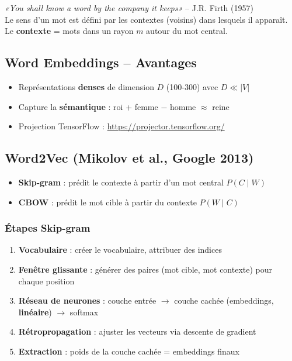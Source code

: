 \documentclass[a4paper,10pt]{article}
\begin{document}
\begin{keybox}
\textit{«You shall know a word by the company it keeps»} -- J.R. Firth (1957)\\
Le sens d'un mot est défini par les contextes (voisins) dans lesquels il apparaît.\\
Le \textbf{contexte} = mots dans un rayon $m$ autour du mot central.
\end{keybox}

\subsection{Word Embeddings -- Avantages}
\begin{itemize}
  \item Représentations \textbf{denses} de dimension $D$ (100-300) avec $D \ll |V|$
  \item Capture la \textbf{sémantique} : roi + femme $-$ homme $\approx$ reine
  \item Projection TensorFlow : \url{https://projector.tensorflow.org/}
\end{itemize}

\subsection{Word2Vec (Mikolov et al., Google 2013)}

\begin{definitionbox}
\begin{itemize}
  \item \textbf{Skip-gram} : prédit le contexte à partir d'un mot central $P(C \mid W)$
  \item \textbf{CBOW} : prédit le mot cible à partir du contexte $P(W \mid C)$
\end{itemize}
\end{definitionbox}

\subsubsection{Étapes Skip-gram}
\begin{enumerate}
  \item \textbf{Vocabulaire} : créer le vocabulaire, attribuer des indices
  \item \textbf{Fenêtre glissante} : générer des paires (mot cible, mot contexte) pour chaque position
  \item \textbf{Réseau de neurones} : couche entrée $\rightarrow$ couche cachée (embeddings, \textbf{linéaire}) $\rightarrow$ softmax
  \item \textbf{Rétropropagation} : ajuster les vecteurs via descente de gradient
  \item \textbf{Extraction} : poids de la couche cachée = embeddings finaux
\end{enumerate}
\end{document}

